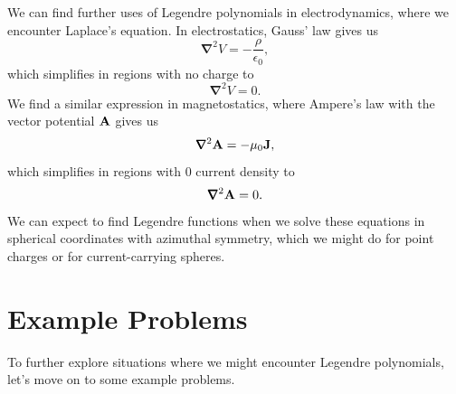 \documentclass[11pt]{report}
\newcommand{\del}{\pmb{\nabla}}
\begin{document}
We can find further uses of Legendre polynomials in electrodynamics, where we encounter Laplace's equation. In electrostatics, Gauss' law gives us 
    \begin{equation*}
        \del^2V = -\frac{\rho}{\epsilon_0},
    \end{equation*}
which simplifies in regions with no charge to
    \begin{equation*}
        \del^2V = 0.
    \end{equation*}
We find a similar expression in magnetostatics, where Ampere's law with the vector potential $\bold{A}$ gives us
    \begin{equation*}
        \del^2\bold{A} = -\mu_0\bold{J},
    \end{equation*}
which simplifies in regions with 0 current density to
    \begin{equation*}
        \del^2\bold{A} = 0.
    \end{equation*}
We can expect to find Legendre functions when we solve these equations in spherical coordinates with azimuthal symmetry, which we might do for point charges or for current-carrying spheres.\\





\section{Example Problems}

To further explore situations where we might encounter Legendre polynomials, let's move on to some example problems.
\end{document}
